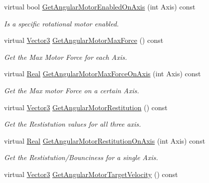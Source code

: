 \begin{DoxyCompactItemize}
virtual bool \hyperlink{classMezzanine_1_1Generic6DofConstraint_a1b23ad89fd57f5272e6c1dfa13957b14}{GetAngularMotorEnabledOnAxis} (int Axis) const 
\begin{DoxyCompactList}\small\item\em Is a specific rotational motor enabled. \item\end{DoxyCompactList}\item 
virtual \hyperlink{classMezzanine_1_1Vector3}{Vector3} \hyperlink{classMezzanine_1_1Generic6DofConstraint_a0ab2e7b20a8aa33c1cbffd77ec2e96a2}{GetAngularMotorMaxForce} () const 
\begin{DoxyCompactList}\small\item\em Get the Max Motor Force for each Axis. \item\end{DoxyCompactList}\item 
virtual \hyperlink{namespaceMezzanine_a726731b1a7df72bf3583e4a97282c6f6}{Real} \hyperlink{classMezzanine_1_1Generic6DofConstraint_a7610b33e8d29925d95cf9d3bf8921301}{GetAngularMotorMaxForceOnAxis} (int Axis) const 
\begin{DoxyCompactList}\small\item\em Get the Max motor Force on a certain Axis. \item\end{DoxyCompactList}\item 
virtual \hyperlink{classMezzanine_1_1Vector3}{Vector3} \hyperlink{classMezzanine_1_1Generic6DofConstraint_a87e8fd1a3fb1d959982f1f684182abbe}{GetAngularMotorRestitution} () const 
\begin{DoxyCompactList}\small\item\em Get the Restistution values for all three axis. \item\end{DoxyCompactList}\item 
virtual \hyperlink{namespaceMezzanine_a726731b1a7df72bf3583e4a97282c6f6}{Real} \hyperlink{classMezzanine_1_1Generic6DofConstraint_ada6e3d47f69b1719d3781af47206763b}{GetAngularMotorRestitutionOnAxis} (int Axis) const 
\begin{DoxyCompactList}\small\item\em Get the Restistution/Bounciness for a single Axis. \item\end{DoxyCompactList}\item 
virtual \hyperlink{classMezzanine_1_1Vector3}{Vector3} \hyperlink{classMezzanine_1_1Generic6DofConstraint_af2626b795dcac300ac75d42bc85dada6}{GetAngularMotorTargetVelocity} () const 

\end{DoxyCompactItemize}
